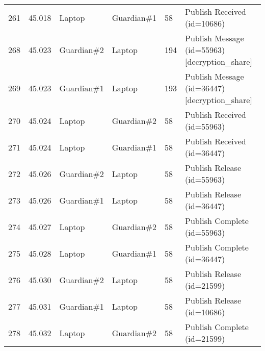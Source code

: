 \begin{table}[]
\begin{tabular}{llllll}
261 & 45.018 & Laptop      & Guardian\#1 & 58     & Publish Received (id=10686)                                                                                                            \\
268 & 45.023 & Guardian\#2 & Laptop      & 194    & Publish Message (id=55963) {[}decryption\_share{]}                                                                                     \\
269 & 45.023 & Guardian\#1 & Laptop      & 193    & Publish Message (id=36447) {[}decryption\_share{]}                                                                                     \\
270 & 45.024 & Laptop      & Guardian\#2 & 58     & Publish Received (id=55963)                                                                                                            \\
271 & 45.024 & Laptop      & Guardian\#1 & 58     & Publish Received (id=36447)                                                                                                            \\
272 & 45.026 & Guardian\#2 & Laptop      & 58     & Publish Release (id=55963)                                                                                                             \\
273 & 45.026 & Guardian\#1 & Laptop      & 58     & Publish Release (id=36447)                                                                                                             \\
274 & 45.027 & Laptop      & Guardian\#2 & 58     & Publish Complete (id=55963)                                                                                                            \\
275 & 45.028 & Laptop      & Guardian\#1 & 58     & Publish Complete (id=36447)                                                                                                            \\
276 & 45.030 & Guardian\#2 & Laptop      & 58     & Publish Release (id=21599)                                                                                                             \\
277 & 45.031 & Guardian\#1 & Laptop      & 58     & Publish Release (id=10686)                                                                                                             \\
278 & 45.032 & Laptop      & Guardian\#2 & 58     & Publish Complete (id=21599)                                                                                                            \\

\end{tabular}
\end{table}
